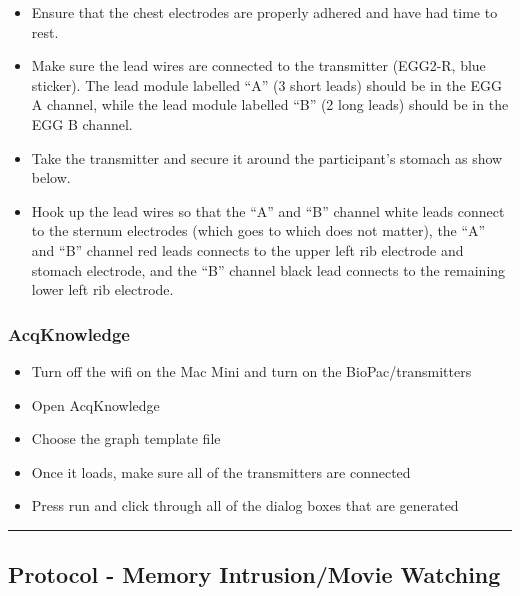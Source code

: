 \documentclass[]{book}
\providecommand{\tightlist}{%
  \setlength{\itemsep}{0pt}\setlength{\parskip}{0pt}}
\begin{document}
\begin{itemize}
\tightlist
\item
  Ensure that the chest electrodes are properly adhered and have had time to rest.
\item
  Make sure the lead wires are connected to the transmitter (EGG2-R, blue sticker). The lead module labelled ``A'' (3 short leads) should be in the EGG A channel, while the lead module labelled ``B'' (2 long leads) should be in the EGG B channel.
\item
  Take the transmitter and secure it around the participant's stomach as show below.
\item
  Hook up the lead wires so that the ``A'' and ``B'' channel white leads connect to the sternum electrodes (which goes to which does not matter), the ``A'' and ``B'' channel red leads connects to the upper left rib electrode and stomach electrode, and the ``B'' channel black lead connects to the remaining lower left rib electrode.
\end{itemize}

\hypertarget{acqknowledge}{%
\subsubsection{AcqKnowledge}\label{acqknowledge}}

\begin{itemize}
\tightlist
\item
  Turn off the wifi on the Mac Mini and turn on the BioPac/transmitters
\item
  Open AcqKnowledge
\item
  Choose the graph template file
\item
  Once it loads, make sure all of the transmitters are connected
\item
  Press run and click through all of the dialog boxes that are generated
\end{itemize}

\begin{center}\rule{0.5\linewidth}{0.5pt}\end{center}

\hypertarget{protocol---memory-intrusionmovie-watching}{%
\subsection{Protocol - Memory Intrusion/Movie Watching}\label{protocol---memory-intrusionmovie-watching}}
\end{document}

